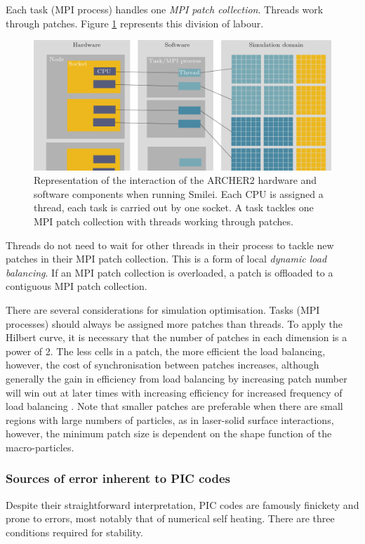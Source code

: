 Each task (MPI process) handles one \textit{MPI patch collection}. Threads work through patches. Figure \ref{fig:introsmileiparallelisationcomplex} represents this division of labour.
\begin{figure}
	\centering
	\includegraphics[width=1\linewidth]{figures/intro/intro_smilei_parallelisation_complex}
	\caption[Representation of the interaction of the ARCHER2 hardware and software components when running Smilei.]{Representation of the interaction of the ARCHER2 hardware and software components when running Smilei. Each CPU is assigned a thread, each task is carried out by one socket. A task tackles one MPI patch collection with threads working through patches.}
	\label{fig:introsmileiparallelisationcomplex}
\end{figure}
Threads do not need to wait for other threads in their process to tackle new patches in their MPI patch collection. This is a form of local \textit{dynamic load balancing}. If an MPI patch collection is overloaded, a patch is offloaded to a contiguous MPI patch collection.

There are several considerations for simulation optimisation. Tasks (MPI processes) should always be assigned more patches than threads. To apply the Hilbert curve, it is necessary that the number of patches in each dimension is a power of 2. The less cells in a patch, the more efficient the load balancing, however, the cost of synchronisation between patches increases, although generally the gain in efficiency from load balancing by increasing patch number will win out at later times with increasing efficiency for increased frequency of load balancing \cite{derouillatSmileiCollaborativeOpensource2018}. Note that smaller patches are preferable when there are small regions with large numbers of particles, as in laser-solid surface interactions, however, the minimum patch size is dependent on the shape function of the macro-particles.

\subsubsection{Sources of error inherent to PIC codes}
Despite their straightforward interpretation, PIC codes are famously finickety and prone to errors, most notably that of numerical self heating. There are three conditions required for stability.


